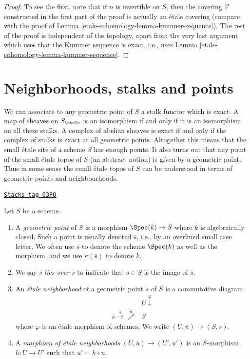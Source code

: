 \begin{proof}
\medskip\noindent
To see the first, note that if $n$ is invertible on $S$, then the
covering $\mathcal{V}$ constructed in the first part of the proof
is actually an \'etale covering (compare with the proof of
Lemma \ref{etale-cohomology-lemma-kummer-sequence}). The rest of the proof is independent
of the topology, apart from the very last argument which uses that
the Kummer sequence is exact, i.e., uses Lemma \ref{etale-cohomology-lemma-kummer-sequence}.
\end{proof}

\section{Neighborhoods, stalks and points}
\label{etale-cohomology-section-stalks}
We can associate to any geometric point of $S$ a stalk functor which is
exact. A map of sheaves on $S_\etale$ is an isomorphism if and only
if it
is an isomorphism on all these stalks. A complex of abelian sheaves is
exact if and only if the complex of stalks is exact at all geometric points.
Altogether this means that the small \'etale site of a scheme $S$
has enough points. It also turns out that any point of the small \'etale topos
of $S$ (an abstract notion) is given by a geometric point.
Thus in some sense the small \'etale topos of $S$ can be understood in
terms of geometric points and neighbourhoods.

\begin{definition}
\label{etale-cohomology-definition-geometric-point}
\href{https://stacks.math.columbia.edu/tag/03PO}{\texttt{Stacks tag 03PO}}

Let $S$ be a scheme.
\begin{enumerate}
\item A {\it geometric point} of $S$ is a morphism
$\Spec(k) \to S$ where $k$ is algebraically closed.
Such a point is usually denoted $\overline{s}$, i.e., by an overlined
small case letter. We often use $\overline{s}$ to denote the scheme
$\Spec(k)$ as well as the morphism, and we use $\kappa(\overline{s})$
to denote $k$.
\item We say $\overline{s}$ {\it lies over} $s$
to indicate that $s \in S$ is the image of $\overline{s}$.
\item An {\it \'etale neighborhood} of a geometric point $\overline{s}$
of $S$ is a commutative diagram
$$
\begin{array}{cc} & U \overset{\varphi}{\downarrow} \\ {\overline{s}} \overset{\overline{s}}{\longrightarrow}\overset{\bar u}{\nearrow} & S\end{array}
$$
where $\varphi$ is an \'etale morphism of schemes.
We write $(U, \overline{u}) \to (S, \overline{s})$.
\item A {\it morphism of \'etale neighborhoods}
$(U, \overline{u}) \to (U', \overline{u}')$
is an $S$-morphism $h: U \to U'$
such that $\overline{u}' = h \circ \overline{u}$.
\end{enumerate}
\end{definition}

